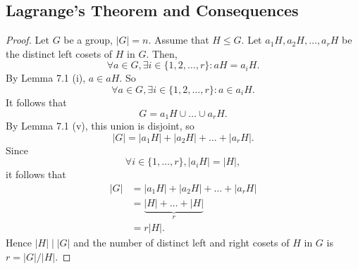 \documentclass{article}
\newtheorem{theorem}{Theorem}[section]
\theoremstyle{definition}
\begin{document}
     \subsection{Lagrange's Theorem and Consequences}
     
     \begin{proof}
        Let $G$ be a group, $|G|=n$. Assume that $H \leq G$. Let $a_1H,a_2H,\dots,a_rH$ be the distinct left cosets of $H$ in $G$. Then,
        \begin{equation*}
            \forall a \in G, \exists i \in \{1,2,\dots,r\}: aH = a_iH.
        \end{equation*}
        By Lemma 7.1 (i), $a \in aH$. So 
        \begin{equation*}
            \forall a \in G, \exists i \in \{1,2,\dots,r\}: a \in a_iH.
        \end{equation*}
        It follows that
        \begin{equation*}
            G = a_1H \cup \dots \cup a_rH.
        \end{equation*}
        By Lemma 7.1 (v), this union is disjoint, so
        \begin{equation*}
            |G| = |a_1H| + |a_2H| + \dots + |a_rH|.
        \end{equation*}
        Since 
        \begin{equation*}
            \forall i \in \{1,\dots, r\}, |a_iH| = |H|,
        \end{equation*}
        it follows that 
        \begin{align*}
            |G| &= |a_1H| + |a_2H| + \dots + |a_rH| \\
            &= \underbrace{|H|+\dots+|H|}_{r} \\
            &= r|H|.
        \end{align*}
        Hence $|H| \mid |G|$ and the number of distinct left and right cosets of $H$ in $G$ is $r=|G|/|H|$.
     \end{proof}
     
\end{document}
